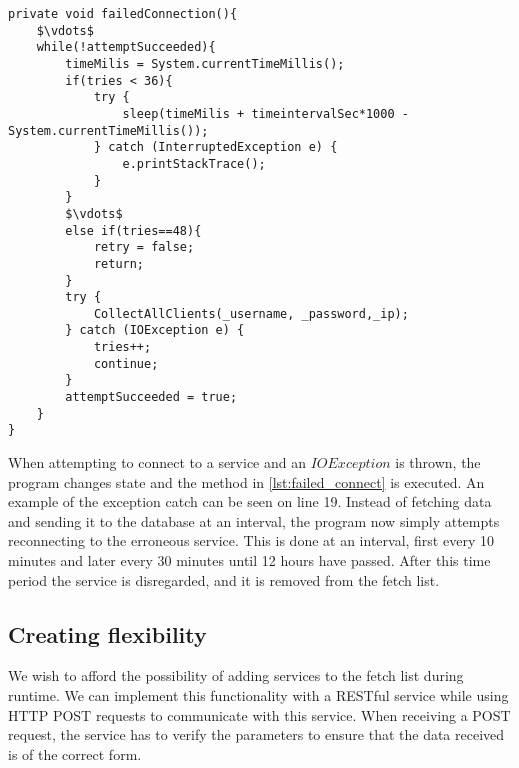 \begin{lstlisting}[caption={Failed Connection snapshot},label={lst:failed_connect},language=inc_Java, mathescape]
private void failedConnection(){
	$\vdots$
    while(!attemptSucceeded){
        timeMilis = System.currentTimeMillis();
        if(tries < 36){
            try {
                sleep(timeMilis + timeintervalSec*1000 - System.currentTimeMillis());
            } catch (InterruptedException e) {
                e.printStackTrace();
            }
        }
        $\vdots$
        else if(tries==48){
        	retry = false;
            return;
        }
        try {
            CollectAllClients(_username, _password,_ip);
        } catch (IOException e) {
            tries++;
            continue;
        }
        attemptSucceeded = true;
    }
}
\end{lstlisting}

When attempting to connect to a service and an $IOException$ is thrown, the program changes state and the method in \cref{lst:failed_connect} is executed. An example of the exception catch can be seen on line 19. Instead of fetching data and sending it to the database at an interval, the program now simply attempts reconnecting to the erroneous service. This is done at an interval, first every 10 minutes and later every 30 minutes until 12 hours have passed. After this time period the service is disregarded, and it is removed from the fetch list.

\subsection*{Creating flexibility}
We wish to afford the possibility of adding services to the fetch list during runtime. We can implement this functionality with a RESTful service while using HTTP POST requests to communicate with this service. When receiving a POST request, the service has to verify the parameters to ensure that the data received is of the correct form. 

